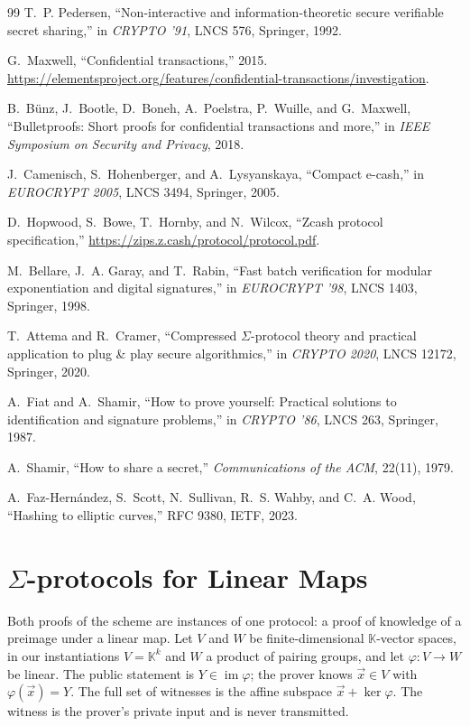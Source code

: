 \documentclass[10pt,a5paper]{article}
\newcommand{\F}{\mathbb{K}}
\newcommand{\vv}[1]{\vec{#1}}
\begin{document}
\begin{thebibliography}{99}
T.~P. Pedersen, ``Non-interactive and information-theoretic secure verifiable
secret sharing,'' in \emph{CRYPTO '91}, LNCS 576, Springer, 1992.

G.~Maxwell, ``Confidential transactions,'' 2015.
\url{https://elementsproject.org/features/confidential-transactions/investigation}.

B.~B\"unz, J.~Bootle, D.~Boneh, A.~Poelstra, P.~Wuille, and G.~Maxwell,
``Bulletproofs: Short proofs for confidential transactions and more,'' in
\emph{IEEE Symposium on Security and Privacy}, 2018.

J.~Camenisch, S.~Hohenberger, and A.~Lysyanskaya, ``Compact e-cash,'' in
\emph{EUROCRYPT 2005}, LNCS 3494, Springer, 2005.

D.~Hopwood, S.~Bowe, T.~Hornby, and N.~Wilcox, ``Zcash protocol
specification,'' \url{https://zips.z.cash/protocol/protocol.pdf}.

M.~Bellare, J.~A. Garay, and T.~Rabin, ``Fast batch verification for modular
exponentiation and digital signatures,'' in \emph{EUROCRYPT '98}, LNCS 1403,
Springer, 1998.

T.~Attema and R.~Cramer, ``Compressed $\Sigma$-protocol theory and practical
application to plug \& play secure algorithmics,'' in \emph{CRYPTO 2020}, LNCS
12172, Springer, 2020.

A.~Fiat and A.~Shamir, ``How to prove yourself: Practical solutions to
identification and signature problems,'' in \emph{CRYPTO '86}, LNCS 263,
Springer, 1987.

A.~Shamir, ``How to share a secret,'' \emph{Communications of the ACM},
22(11), 1979.

A.~Faz-Hern\'andez, S.~Scott, N.~Sullivan, R.~S. Wahby, and C.~A. Wood,
``Hashing to elliptic curves,'' RFC 9380, IETF, 2023.
\end{thebibliography}

\appendix
\section{\texorpdfstring{$\Sigma$}{Sigma}-protocols for Linear Maps}
\label{app:sigma}

Both proofs of the scheme are instances of one protocol: a proof of knowledge
of a preimage under a linear map. Let $V$ and $W$ be finite-dimensional
$\F$-vector spaces, in our instantiations $V = \F^k$ and $W$ a product of
pairing groups, and let $\varphi : V \to W$ be linear. The public statement is
$Y \in \operatorname{im}\varphi$; the prover knows $\vv{x} \in V$ with
$\varphi(\vv{x}) = Y$. The full set of witnesses is the affine subspace
$\vv{x} + \ker\varphi$. The witness is the prover's private input and is never
transmitted.
\end{document}
